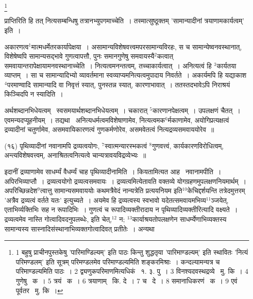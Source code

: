 \documentclass[11pt, openany]{book}
\newcommand\blfootnote[1]{%
 \begingroup
 \renewcommand\thefootnote{}\footnote{#1}%
 \addtocounter{footnote}{-1}%
 \endgroup
}
\begin{document}
\blfootnote{1 बहुषु प्राचीनपुस्तकेषु 'पारिमाण्डिल्यम्' इति पाठः किन्तु शुद्धतृया 'पारिमाण्डल्यम्' इति स्थावितः 'नित्यं परिमण्डलम्' इति सूत्रम् परिमण्डलमेव परिमाण्डल्यमिति शङ्करमिश्राः~। कन्दल्यामन्यत्र च परिमाण्डल्यमिति पाठः~। 2 द्व्यणुकपरिमाणमित्यधिकं  \textendash\ १. ३. पु~। 3 विनश्यदवस्थद्रव्ये  \textendash\ मु. कि~। 4 गुणेषु  \textendash\ क~। 5 त्रयं  \textendash\ क~। 6 त्रयाणाम्  \textendash\ कि. दे~। 7 च  \textendash\ दे~। 8 समानाधिकरणं  \textendash\ क~। 9 एवं पूर्वतर  \textendash\ मु. कि~।}

\newpage
\noindent
प्राप्तिरिति हि तत् नित्यसम्बन्धिषु तत्रानभ्युपगमाच्चेति~। तस्मात्सुष्ठूक्तम् 'सामान्यादीनां त्रयाणामकार्यत्वम्' इति~।

अकारणत्व$^1$मात्मधर्मेतरकार्यापेक्षया~। असामान्यविशेषवत्त्वमपरसामान्यविरहः, स च सामान्येष्वनवस्थानात्, विशेषेष्वपि सामान्यसद्भावे गुणत्वापत्तौ, पुनः समानगुणेषु समवायस्यै$^2$कत्वात् समवायान्तरापेक्षायामनवस्थानाच्चेति~। नित्यत्वमनन्तत्वम्, तच्चाकार्यत्वात्~। अनित्यत्वं हि ${}^3$कार्यतया व्याप्तम्~। सा च सामान्यादिभ्यो व्यावर्तमाना स्वव्याप्यमनित्यत्वमुपादाय निवर्तते~। अकार्यमपि हि यद्याकाश$^4$परमाण्वादि सामान्यादि वा निवृत्तं स्यात्, पुनस्तन्न स्यात्, कारणाभावात्~। ततस्तदभावेऽपि निराश्रयं किञ्चिदपि न स्यादिति~।

\begin{sloppypar}
अर्थशब्दानभिधेयत्वम् \textendash\ स्वसमयार्थशब्दानभिधेयत्वम्~। चकारात् ${}^5$कारणानपेक्षत्वम्~। उपलक्षणं चैतत्~। एवमन्यदप्यूहनीयम्~। तद्यथा \textendash\ अनित्यधर्मत्वमविशेषाणामेव, नित्यत्वमक$^6$र्मकाणामेव, अयोगिप्रत्यक्षत्वं द्रव्यादीनां चतुर्णामेव, असमवायिकारणत्वं गुणकर्मणोरेव, असमवेतत्वं नित्यद्रव्यसमवाययोरेव~॥
\end{sloppypar}

\hangindent=2cm {\knu (१६) पृथिव्यादीनां नवानामपि द्रव्यत्वयोगः, ${}^7$स्वात्मन्यारस्भकत्वं ${}^8$गुणवत्त्वं, कार्यकारणविरोधित्वम्, अन्त्यविशेषवत्त्वम्, अनाश्रितत्वनित्यत्वे चान्यत्रावयविद्रव्येभ्यः~॥}

इदानीं द्रव्याणामेव साधर्म्यं वैधर्म्यं चाह {\knu पृथिव्यादीना}मिति~। कियतामित्यत आह \textendash\ {\knu नवानामपी}ति~। अपिरभिव्याप्तौ~। द्रव्यत्वयोगो द्रव्यत्वसमवायः~। द्रव्यत्वमित्येतावति वक्तव्ये योगग्रहणमुपलक्षणनियमार्थम्~। अपरिच्छिन्नदेश$^9$त्वात्तु सामान्यसमवाययोः कथमत्रैवेदं नान्यत्रेति प्रत्ययनियम इति${}^10$केचिद्दर्शयन्ति तत्रेदमुत्तरम् 'अत्रैव द्रव्यत्वं वर्तते यतः' इत्युच्यते~। अयमेव हि द्रव्यत्वस्य स्वभावो यदेतत्समवायमभिव्य$^11$ञ्जयेत्, एताभिर्व्यक्तिभिः सह न रूपादिभिः~। गुणत्वं च रूपादिव्यक्तीरादाय न पृथिव्यादिव्यक्तीरित्यादि वक्ष्यते~। द्रव्यत्वमेव नास्ति गोत्वादिवदनुपलब्धेः, इति चेत्,$^12$ न; ${}^13$कार्याश्रयतोपलक्षणेन साधर्म्येणाभिव्यक्तस्य सामान्यस्य सास्नादिसंस्थानाभिव्यक्तगोत्वादिवत् प्रतीतेः~। अन्यथा
\end{document}
